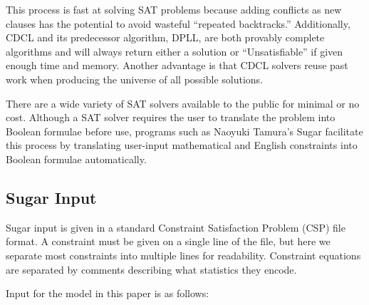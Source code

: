 \documentclass[runningheads]{llncs}
\begin{document}
This process is fast at solving SAT problems because adding conflicts as new clauses
has the potential to avoid wasteful ``repeated backtracks.''
Additionally, CDCL and its predecessor algorithm, DPLL, are both
provably complete algorithms and will always return either a solution
or ``Unsatisfiable'' if given enough time and memory. Another
advantage is that CDCL solvers reuse past work when producing the universe of all
possible solutions.

There are a wide variety of SAT solvers available to the public for
minimal or no cost. Although a SAT solver requires the user to
translate the problem into Boolean formulae before use, programs such
as Naoyuki Tamura's Sugar facilitate this process by translating
user-input mathematical and English constraints into Boolean formulae
automatically.

\subsection{Sugar Input}

Sugar input is given in a standard Constraint Satisfaction Problem
(CSP) file format. A constraint must be given on a single line of the
file, but here we separate most constraints into multiple lines for
readability. Constraint equations are separated by comments describing
what statistics they encode.

Input for the model in this paper is as follows:

\end{document}
